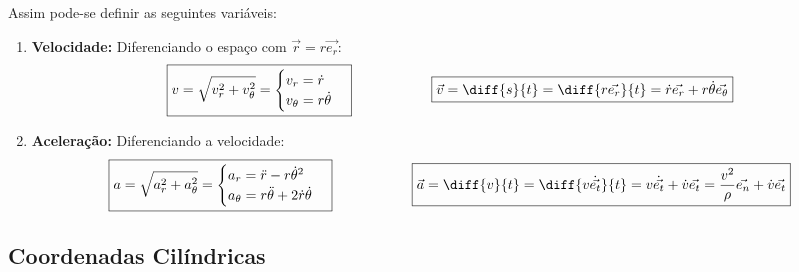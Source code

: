 \documentclass{article}
\begin{document}
            Assim pode-se definir as seguintes variáveis:
                \begin{enumerate}[noitemsep]
                    \item \textbf{Velocidade:} Diferenciando o espaço com $\vec{r} = r \vec{e_{r}}$:
                        \begin{equation}
                            \boxed{
                                v = \sqrt{v_{r}^{2} + v_{\theta}^{2}} =
                                \begin{cases}
                                    v_{r} = \dot{r}\\
                                    v_{\theta} = r\dot{\theta}\\
                                \end{cases}
                            }
                            \hspace{20mm}
                            \boxed{
                                \vec{v} = \diff{s}{t} = \diff{r \vec{e_{r}}}{t} = \dot{r}\vec{e_{r}} + r\dot{\theta}\vec{e_{\theta}}
                            }
                        \end{equation}

                    \item \textbf{Aceleração:} Diferenciando a velocidade:
                        \begin{equation}
                            \boxed{
                                a = \sqrt{a_{r}^{2} + a_{\theta}^{2}} =
                                \begin{cases}
                                    a_{r} = \ddot{r} - r\dot{\theta}^{2}\\
                                    a_{\theta} = r\ddot{\theta} + 2\dot{r}\dot{\theta}\\
                                \end{cases}
                            }
                            \hspace{20mm}
                            \boxed{
                                \vec{a} = \diff{v}{t} = \diff{v\dot{\vec{e_{t}}}}{t} = v \dot{\vec{e_{t}}} + \dot{v}\vec{e_{t}} = \frac{v^{2}}{\rho}\vec{e_{n}} + \dot{v}\vec{e_{t}}
                            }
                        \end{equation}
                \end{enumerate}

        \subsection{Coordenadas Cilíndricas}
\end{document}
